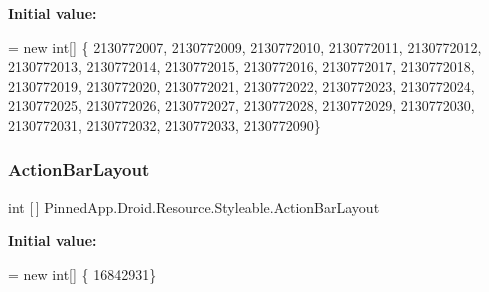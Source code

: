{\bfseries Initial value\+:}
\begin{DoxyCode}
= \textcolor{keyword}{new} \textcolor{keywordtype}{int}[] \{
                    2130772007,
                    2130772009,
                    2130772010,
                    2130772011,
                    2130772012,
                    2130772013,
                    2130772014,
                    2130772015,
                    2130772016,
                    2130772017,
                    2130772018,
                    2130772019,
                    2130772020,
                    2130772021,
                    2130772022,
                    2130772023,
                    2130772024,
                    2130772025,
                    2130772026,
                    2130772027,
                    2130772028,
                    2130772029,
                    2130772030,
                    2130772031,
                    2130772032,
                    2130772033,
                    2130772090\}
\end{DoxyCode}
\mbox{\label{class_pinned_app_1_1_droid_1_1_resource_1_1_styleable_a56dafce9bdf9714771dfd4b1b461c03e}} 
\subsubsection{\texorpdfstring{Action\+Bar\+Layout}{ActionBarLayout}}
{\footnotesize\ttfamily int \mbox{[}$\,$\mbox{]} Pinned\+App.\+Droid.\+Resource.\+Styleable.\+Action\+Bar\+Layout\hspace{0.3cm}{\ttfamily [static]}}

{\bfseries Initial value\+:}
\begin{DoxyCode}
= \textcolor{keyword}{new} \textcolor{keywordtype}{int}[] \{
                    16842931\}
\end{DoxyCode}
\mbox{\label{class_pinned_app_1_1_droid_1_1_resource_1_1_styleable_a34db40b71cc1e81cdafe70d883a318e4}} 
